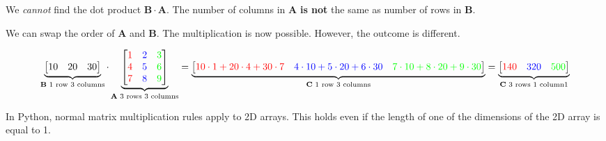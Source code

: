 \documentclass[11pt]{article}
\begin{document}
We \emph{cannot} find the dot product \(\mathbf{B}\cdot\mathbf{A}\). The
number of columns in \(\mathbf{A}\) \textbf{is not} the same as number
of rows in \(\mathbf{B}\).

    We can swap the order of \(\mathbf{A}\) and \(\mathbf{B}\). The
multiplication is now possible. However, the outcome is different.

\begin{equation*}
\underbrace{
\begin{bmatrix}
10 & 20 & 30 \\
\end{bmatrix}
}_{\mathbf{B} \text{ 1 row} \text{ 3 columns}}
\cdot
\underbrace{
\begin{bmatrix}
\color{red}1 & \color{blue}2 & \color{green}3 \\
\color{red}4 & \color{blue}5 & \color{green}6 \\
\color{red}7 & \color{blue}8 & \color{green}9 \\
\end{bmatrix}
}_{\mathbf{A} \text{  3 rows} \text{  3 columns}}
=\underbrace{
\begin{bmatrix}
\color{red}{10 \cdot 1 + 20 \cdot 4 + 30 \cdot 7} &
\color{blue}{4 \cdot 10 + 5 \cdot 20 + 6 \cdot 30} &
\color{green}{7 \cdot 10 + 8 \cdot 20 + 9 \cdot 30} \\
\end{bmatrix}
}_{\mathbf{C} \text{  1 row} \text{  3 columns}}
=\underbrace{
\begin{bmatrix}
\color{red}{140} &
\color{blue}{320} &
\color{green}{500} \\
\end{bmatrix}
}_{\mathbf{C} \text{  3 rows} \text{  1 column1}}
\end{equation*}

    In Python, normal matrix multiplication rules apply to 2D arrays. This
holds even if the length of one of the dimensions of the 2D array is
equal to 1.
\end{document}
